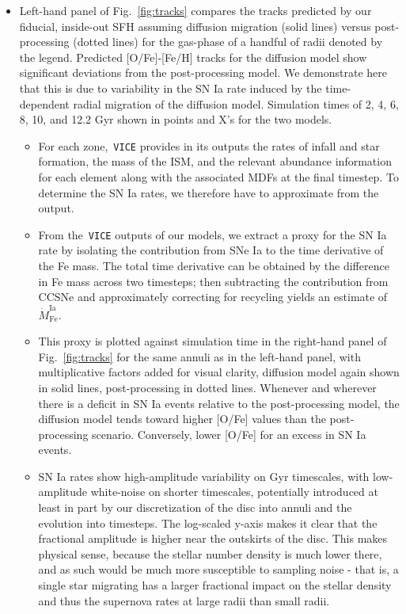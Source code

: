 \documentclass[fleqn, usenatbib]{mnras}
\begin{document}
\begin{itemize} 

	\item Left-hand panel of Fig.~\ref{fig:tracks} compares the tracks 
	predicted by our fiducial, inside-out SFH assuming diffusion migration 
	(solid lines) versus post-processing (dotted lines) for the gas-phase of a 
	handful of radii denoted by the legend. Predicted [O/Fe]-[Fe/H] tracks for 
	the diffusion model show significant deviations from the post-processing 
	model. We demonstrate here that this is due to variability in the SN Ia 
	rate induced by the time-dependent radial migration of the diffusion 
	model. Simulation times of 2, 4, 6, 8, 10, and 12.2 Gyr shown in points 
	and X's for the two models. 

	\begin{itemize} 
		\item For each zone,~\texttt{VICE} provides in its outputs the rates 
		of infall and star formation, the mass of the ISM, and the relevant 
		abundance information for each element along with the associated 
		MDFs at the final timestep. To determine the SN Ia rates, we therefore 
		have to approximate from the output. 

		\item From the~\texttt{VICE} outputs of our models, we extract a 
		proxy for the SN Ia rate by isolating the contribution from SNe Ia to 
		the time derivative of the Fe mass. The total time derivative can be 
		obtained by the difference in Fe mass across two timesteps; then 
		subtracting the contribution from CCSNe and approximately correcting 
		for recycling yields an estimate of~$\dot{M}_\text{Fe}^\text{Ia}$. 

		\item This proxy is plotted against simulation time in the right-hand 
		panel of Fig.~\ref{fig:tracks} for the same annuli as in the left-hand 
		panel, with multiplicative factors added for visual clarity, diffusion 
		model again shown in solid lines, post-processing in dotted lines. 
		Whenever and wherever there is a deficit in SN Ia events relative to 
		the post-processing model, the diffusion model tends toward higher 
		[O/Fe] values than the post-processing scenario. Conversely, lower 
		[O/Fe] for an excess in SN Ia events. 

		\item SN Ia rates show high-amplitude variability on Gyr timescales, 
		with low-amplitude white-noise on shorter timescales, potentially 
		introduced at least in part by our discretization of the disc into 
		annuli and the evolution into timesteps. The log-scaled y-axis makes 
		it clear that the fractional amplitude is higher near the outskirts 
		of the disc. This makes physical sense, because the stellar number 
		density is much lower there, and as such would be much more 
		susceptible to sampling noise - that is, a single star migrating 
		has a larger fractional impact on the stellar density and thus the 
		supernova rates at large radii than small radii. 


\end{itemize}
\end{itemize}
\end{document}

